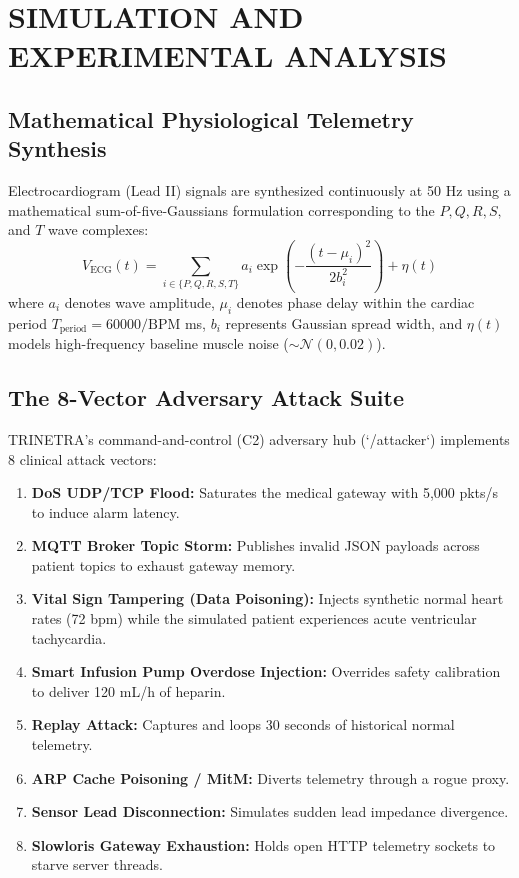 \documentclass[12pt,a4paper]{report}
\begin{document}
\chapter{SIMULATION AND EXPERIMENTAL ANALYSIS}

\section{Mathematical Physiological Telemetry Synthesis}
Electrocardiogram (Lead II) signals are synthesized continuously at 50 Hz using a mathematical sum-of-five-Gaussians formulation corresponding to the $P, Q, R, S,$ and $T$ wave complexes:
\begin{equation}
    V_{\text{ECG}}(t) = \sum_{i \in \{P, Q, R, S, T\}} a_i \exp \left( -\frac{(t - \mu_i)^2}{2 b_i^2} \right) + \eta(t)
\end{equation}
where $a_i$ denotes wave amplitude, $\mu_i$ denotes phase delay within the cardiac period $T_{\text{period}} = 60000 / \text{BPM}$ ms, $b_i$ represents Gaussian spread width, and $\eta(t)$ models high-frequency baseline muscle noise ($\sim \mathcal{N}(0, 0.02)$).

\section{The 8-Vector Adversary Attack Suite}
TRINETRA's command-and-control (C2) adversary hub (`/attacker`) implements 8 clinical attack vectors:
\begin{enumerate}
    \item \textbf{DoS UDP/TCP Flood:} Saturates the medical gateway with 5,000 pkts/s to induce alarm latency.
    \item \textbf{MQTT Broker Topic Storm:} Publishes invalid JSON payloads across patient topics to exhaust gateway memory.
    \item \textbf{Vital Sign Tampering (Data Poisoning):} Injects synthetic normal heart rates (72 bpm) while the simulated patient experiences acute ventricular tachycardia.
    \item \textbf{Smart Infusion Pump Overdose Injection:} Overrides safety calibration to deliver 120 mL/h of heparin.
    \item \textbf{Replay Attack:} Captures and loops 30 seconds of historical normal telemetry.
    \item \textbf{ARP Cache Poisoning / MitM:} Diverts telemetry through a rogue proxy.
    \item \textbf{Sensor Lead Disconnection:} Simulates sudden lead impedance divergence.
    \item \textbf{Slowloris Gateway Exhaustion:} Holds open HTTP telemetry sockets to starve server threads.
\end{enumerate}
\end{document}
